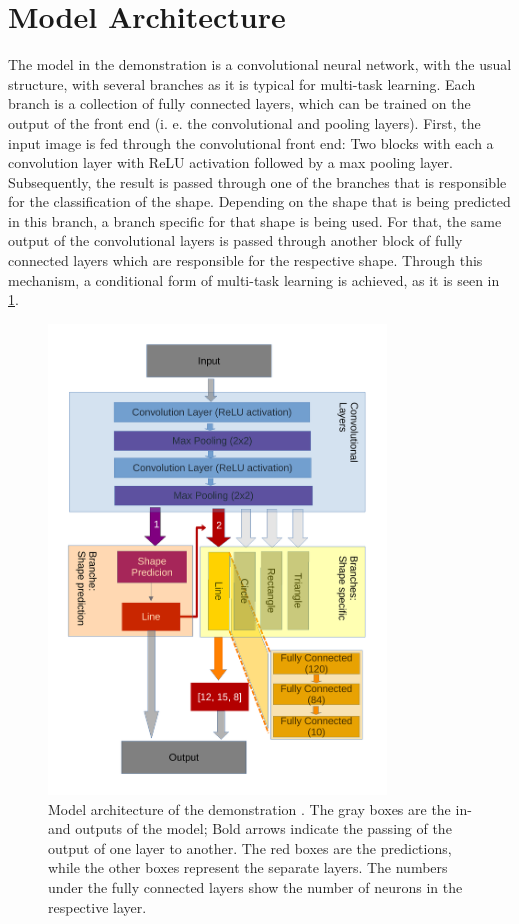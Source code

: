 \documentclass[12pt, a4paper, titlepage]{report}
\begin{document}
\section{Model Architecture}

The model in the demonstration is a convolutional neural network, with the usual structure, with several branches as it is typical for multi-task learning. Each branch is a collection of fully connected layers, which can be trained on the output of the front end (i. e. the convolutional and pooling layers).
First, the input image is fed through the convolutional front end: Two blocks with each a convolution layer with ReLU activation followed by a max pooling layer. Subsequently, the result is passed through one of the branches that is responsible for the classification of the shape. Depending on the shape that is being predicted in this branch, a branch specific for that shape is being used.
For that, the same output of the convolutional layers is passed through another block of fully connected layers which are responsible for the respective shape. Through this mechanism, a conditional form of multi-task learning is achieved, as it is seen in \ref{fig:rtov_architecture}.

\begin{figure}[h]
   \includegraphics[width=0.8\textwidth]{../rc/images/rtov_architecture.pdf}
   \caption{Model architecture of the demonstration \cite{scheme_rtov_architecture}. The gray boxes are the in- and outputs of the model; Bold arrows indicate the passing of the output of one layer to another. The red boxes are the predictions, while the other boxes represent the separate layers. The numbers under the fully connected layers show the number of neurons in the respective layer.}
   \label{fig:rtov_architecture}
\end{figure}
\end{document}
